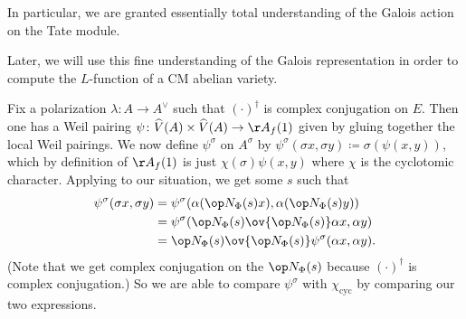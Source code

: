 \documentclass[../notes.tex]{subfiles}
\begin{document}
In particular, we are granted essentially total understanding of the Galois action on the Tate module.
\begin{remark}
	Later, we will use this fine understanding of the Galois representation in order to compute the $L$-function of a CM abelian variety.
\end{remark}
\begin{remark}
	Fix a polarization $\lambda\colon A\to A^\lor$ such that $(\cdot)^\dagger$ is complex conjugation on $E$. Then one has a Weil pairing $\psi\colon\widehat V(A)\times\widehat V(A)\to\AA_f(1)$ given by gluing together the local Weil pairings. We now define $\psi^\sigma$ on $A^\sigma$ by $\psi^\sigma(\sigma x,\sigma y)\coloneqq\sigma(\psi(x,y))$, which by definition of $\AA_f(1)$ is just $\chi(\sigma)\psi(x,y)$ where $\chi$ is the cyclotomic character. Applying  to our situation, we get some $s$ such that
	\begin{align*}
		\psi^\sigma(\sigma x,\sigma y) &= \psi^\sigma(\alpha(\op N_\Phi(s)x),\alpha(\op N_\Phi(s)y)) \\
		&= \psi^\sigma(\op N_\Phi(s)\ov{\op N_\Phi(s)}\alpha x,\alpha y) \\
		&= \op N_\Phi(s)\ov{\op N_\Phi(s)}\psi^\sigma(\alpha x,\alpha y).
	\end{align*}
	(Note that we get complex conjugation on the $\op N_\Phi(s)$ because $(\cdot)^\dagger$ is complex conjugation.) So we are able to compare $\psi^\sigma$ with $\chi_{\mathrm{cyc}}$ by comparing our two expressions.
\end{remark}
\end{document}
